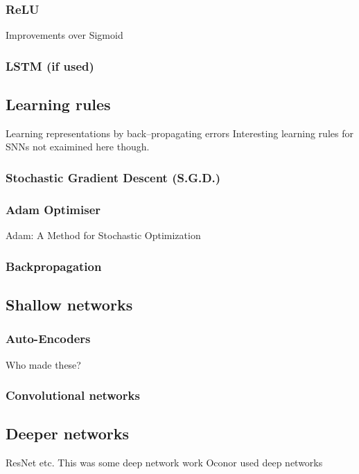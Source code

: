 \subsubsection{ReLU}
Improvements over Sigmoid

\subsubsection{LSTM (if used)}


\pagebreak
\subsection{Learning rules}
Learning representations by back--propagating errors\cite{Rumelhart1986}
Interesting learning rules for SNNs \cite{Bichler} not exaimined here though.

\subsubsection{Stochastic Gradient Descent (S.G.D.)}

\subsubsection{Adam Optimiser}
Adam: A Method for Stochastic Optimization \cite{kingma2014adam}

\subsubsection{Backpropagation}

\pagebreak

\subsection{Shallow networks}  

\subsubsection{Auto-Encoders}  %
Who made these?

\subsubsection{Convolutional networks}

\pagebreak
\subsection{Deeper networks}   %
ResNet etc. %
This was some deep network work \cite{pedroni2013neuromorphic}
Oconor used deep networks \cite{OConnor2013}

